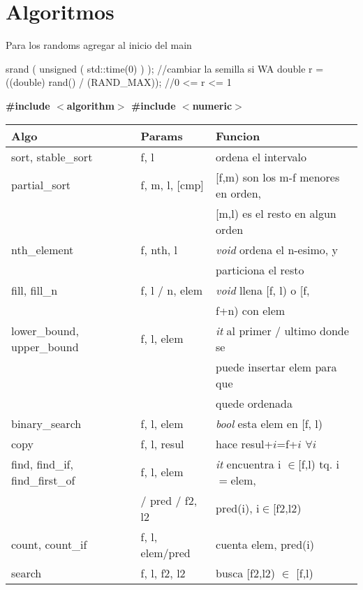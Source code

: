 \documentclass[10pt, landscape, twocolumn, a4paper, notitlepage]{article}
\begin{document}
\tableofcontents\newpage

\section{Algoritmos}
Para los randoms agregar al inicio del main
\begin{code}
srand ( unsigned ( std::time(0) ) ); //cambiar la semilla si WA
double r = ((double) rand() / (RAND_MAX)); //0 <= r <= 1 
\end{code}
\textbf{\#include $<$algorithm$>$ \#include $<$numeric$>$ \\}
\begin{tabular}{|l|l|l|} \hline
\textbf{Algo} & \textbf{Params} &  \textbf{Funcion} \\  \hline
sort, stable\_sort & f, l &  ordena el intervalo \\  \hline
partial\_sort & f, m, l, [cmp] & [f,m) son los m-f menores en orden, \\ && [m,l) es el resto en algun orden \\ \hline
nth\_element & f, nth, l & \textit{void} ordena el n-esimo, y \\ && particiona el resto \\  \hline
fill, fill\_n & f, l / n, elem & \textit{void} llena [f, l) o [f, \\ && f+n) con elem \\  \hline
lower\_bound, upper\_bound & f, l, elem & \textit{it} al primer / ultimo donde se \\ && puede insertar elem para que\\ && quede ordenada \\  \hline
binary\_search & f, l, elem & \textit{bool} esta elem en [f, l) \\  \hline
copy & f, l, resul & hace resul+$i$=f+$i$ $\forall i$ \\  \hline
find, find\_if, find\_first\_of & f, l, elem & \textit{it} encuentra i $\in$[f,l) tq. i$=$elem, \\ & / pred / f2, l2 & pred(i), i$\in$[f2,l2) \\ \hline
count, count\_if & f, l, elem/pred & cuenta elem, pred(i) \\ \hline
search & f, l, f2, l2 & busca [f2,l2) $\in$ [f,l) \\ \hline

\end{tabular}
\end{document}
